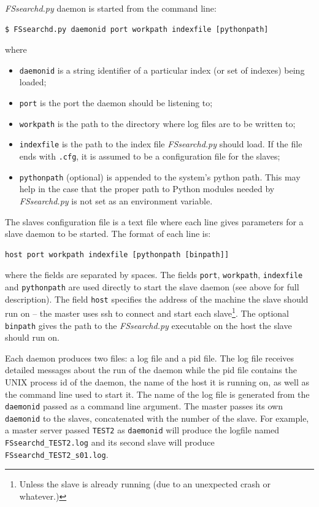 \documentclass[11pt]{article}
\begin{document}
\textit{FSsearchd.py} daemon is started from the command line:
\begin{verbatim}
$ FSsearchd.py daemonid port workpath indexfile [pythonpath]
\end{verbatim}
where
\begin{itemize}
\item \texttt{daemonid} is a string identifier of a particular index (or set of indexes) being loaded;
\item \texttt{port} is the port the daemon should be listening to;
\item \texttt{workpath} is the path to the directory where log files are to be written to;
\item \texttt{indexfile} is the path to the index file \textit{FSsearchd.py} should load. If the file ends with \texttt{.cfg}, it is assumed to be a configuration file for the slaves;
\item \texttt{pythonpath} (optional) is appended to the system's python path. This may help in the case that the proper path to Python modules needed by \textit{FSsearchd.py} is not set as an environment variable.
\end{itemize}

The slaves configuration file is a text file where each line gives parameters for a slave daemon to be started. The format of each line is:
\begin{verbatim}
host port workpath indexfile [pythonpath [binpath]]
\end{verbatim}
where the fields are separated by spaces. The fields \texttt{port}, \texttt{workpath}, \texttt{indexfile} and \texttt{pythonpath} are used directly to start the slave daemon (see above for full description). The field \texttt{host} specifies the address of the machine the slave should run on -- the master uses ssh to connect and start each slave\footnote{Unless the slave is already running (due to an unexpected crash or whatever.)}. The optional \texttt{binpath} gives the path to the \textit{FSsearchd.py} executable on the host the slave should run on.

Each daemon produces two files: a log file and a pid file. The log file receives detailed messages about the run of the daemon while the pid file contains the UNIX process id of the daemon, the name of the host it is running on, as well as the command line used to start it. The name of the log file is generated from the \texttt{daemonid} passed as a command line argument. The master passes its own \texttt{daemonid} to the slaves, concatenated with the number of the slave. For example, a master server passed \texttt{TEST2} as \texttt{daemonid} will produce the logfile named \texttt{FSsearchd\_TEST2.log} and its second slave will produce \texttt{FSsearchd\_TEST2\_s01.log}.
\end{document}
